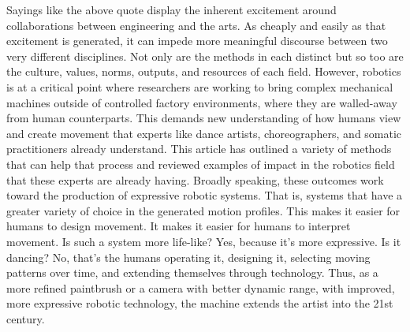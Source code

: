 \documentclass[arts,article,submit,moreauthors,pdftex,10pt,a4paper]{mdpi}
\begin{document}
Sayings like the above quote display the inherent excitement around collaborations between engineering and the arts.  As cheaply and easily as that excitement is generated, it can impede more meaningful discourse between two very different disciplines.  Not only are the methods in each distinct but so too are the culture, values, norms, outputs, and resources of each field.  However, robotics is at a critical point where researchers are working to bring complex mechanical machines outside of controlled factory environments, where they are walled-away from human counterparts.  This demands new understanding of how humans view and create movement that experts like dance artists, choreographers, and somatic practitioners already understand.  This article has outlined a variety of methods that can help that process and reviewed examples of impact in the robotics field that these experts are already having.  Broadly speaking, these outcomes work toward the production of expressive robotic systems.  That is, systems that have a greater variety of choice in the generated motion profiles.  This makes it easier for humans to design movement.  It makes it easier for humans to interpret movement.
Is such a system more life-like? Yes, because it’s more expressive. Is it dancing? No, that’s the humans operating it, designing it, selecting moving patterns over time, and extending themselves through technology. 
Thus, as a more refined paintbrush or a camera with better dynamic range, with improved, more expressive robotic technology, the machine extends the artist into the 21st century. 

\vspace{6pt} 


\end{document}
